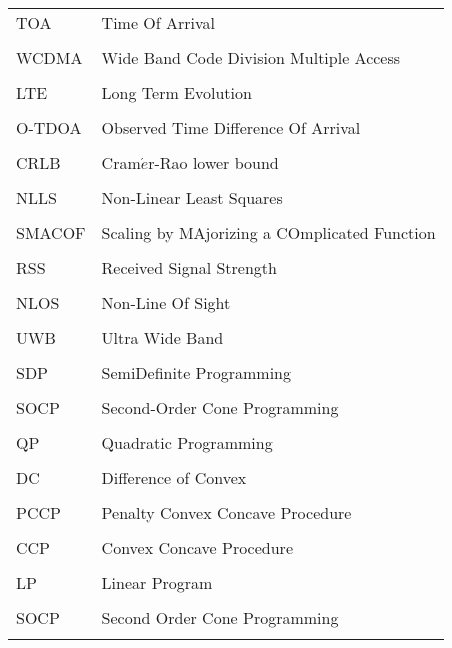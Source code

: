 \begin{longtable}[h]{l l}
\\
TOA & Time Of Arrival \\
\\
WCDMA & Wide Band Code Division Multiple Access \\
\\
LTE & Long Term Evolution \\
\\
O-TDOA & Observed Time Difference Of Arrival\\
\\
CRLB & Cram$\acute{e}$r-Rao  lower  bound \\
\\
NLLS & Non-Linear Least Squares \\
\\
SMACOF & Scaling by MAjorizing a COmplicated Function \\
\\
RSS & Received Signal Strength \\
\\
NLOS & Non-Line Of Sight \\
\\
UWB & Ultra Wide Band \\
\\
SDP & SemiDefinite Programming \\
\\
SOCP & Second-Order Cone Programming \\
\\
QP & Quadratic Programming \\
\\
DC & Difference of Convex \\
\\
PCCP & Penalty Convex Concave Procedure \\
\\
CCP & Convex Concave Procedure \\
\\
LP & Linear Program \\
\\
SOCP & Second Order Cone Programming \\
\\
\end{longtable}

